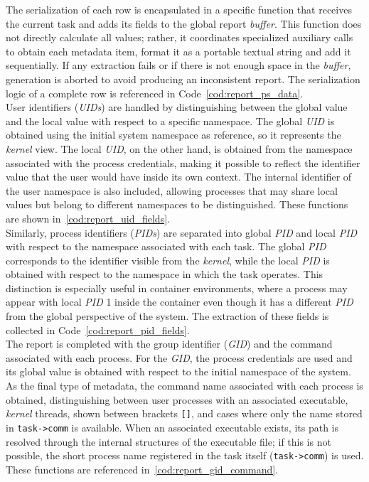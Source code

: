 The serialization of each row is encapsulated in a specific function that receives the current task and adds its fields to the global report \textit{buffer}.
This function does not directly calculate all values; rather, it coordinates specialized auxiliary calls to obtain each metadata item, format it as a portable textual string and add it sequentially.
If any extraction fails or if there is not enough space in the \textit{buffer}, generation is aborted to avoid producing an inconsistent report.
The serialization logic of a complete row is referenced in Code~\ref{cod:report_ps_data}.\\

User identifiers (\textit{UIDs}) are handled by distinguishing between the global value and the local value with respect to a specific namespace.
The global \textit{UID} is obtained using the initial system namespace as reference, so it represents the \textit{kernel} view.
The local \textit{UID}, on the other hand, is obtained from the namespace associated with the process credentials, making it possible to reflect the identifier value that the user would have inside its own context.
The internal identifier of the user namespace is also included, allowing processes that may share local values but belong to different namespaces to be distinguished.
These functions are shown in~\ref{cod:report_uid_fields}.\\

Similarly, process identifiers (\textit{PIDs}) are separated into global \textit{PID} and local \textit{PID} with respect to the namespace associated with each task.
The global \textit{PID} corresponds to the identifier visible from the \textit{kernel}, while the local \textit{PID} is obtained with respect to the namespace in which the task operates.
This distinction is especially useful in container environments, where a process may appear with local \textit{PID} 1 inside the container even though it has a different \textit{PID} from the global perspective of the system.
The extraction of these fields is collected in Code~\ref{cod:report_pid_fields}.\\

The report is completed with the group identifier (\textit{GID}) and the command associated with each process.
For the \textit{GID}, the process credentials are used and its global value is obtained with respect to the initial namespace of the system.
As the final type of metadata, the command name associated with each process is obtained, distinguishing between user processes with an associated executable, \textit{kernel} threads, shown between brackets \texttt{[]}, and cases where only the name stored in \texttt{task->comm} is available.
When an associated executable exists, its path is resolved through the internal structures of the executable file; if this is not possible, the short process name registered in the task itself (\texttt{task->comm}) is used.
These functions are referenced in~\ref{cod:report_gid_command}.\\


